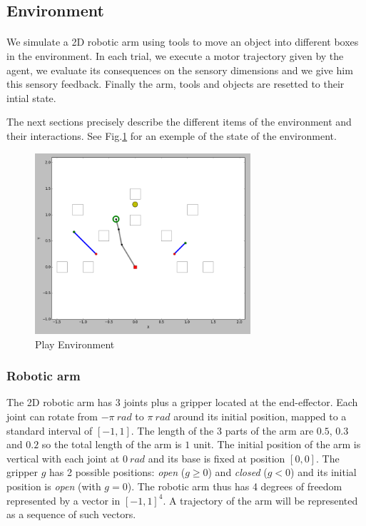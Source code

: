 \documentclass[10pt,letterpaper]{article}
\begin{document}
	\subsection{Environment}
	
		\paragraph{}
		We simulate a 2D robotic arm using tools to move an object into different boxes in the environment. 		
		In each trial, we execute a motor trajectory given by the agent, we evaluate its consequences on the sensory dimensions and we give him
		this sensory feedback. Finally the arm, tools and objects are resetted to their intial state.
		
		The next sections precisely describe the different items of the environment and their interactions.	
		See Fig.\ref{env} for an exemple of the state of the environment. 
		
		\begin{figure}[h]
			\centering
			\includegraphics[width=8cm]{./include/tools.png}
			\caption{Play Environment}
			\label{env}
		\end{figure}
			

		\subsubsection{Robotic arm}
		
			The 2D robotic arm has 3 joints plus a gripper located at the end-effector.
			Each joint can rotate from $-\pi~rad$ to $\pi~rad$ around its initial position, mapped to a standard interval of $[-1,1]$.
			The length of the 3 parts of the arm are $0.5$, $0.3$ and $0.2$ so the total length of the arm is $1$ unit.
			The initial position of the arm is vertical with each joint at $0~rad$ and its base is fixed at position $[0, 0]$.
			The gripper $g$ has 2 possible positions: \textit{open} ($g \geq 0$) and \textit{closed} ($g < 0$) and its initial position is \textit{open} (with $g = 0$).
			The robotic arm thus has 4 degrees of freedom represented by a vector in $[-1,1]^4$.
			A trajectory of the arm will be represented as a sequence of such vectors.\\
		
\end{document}
